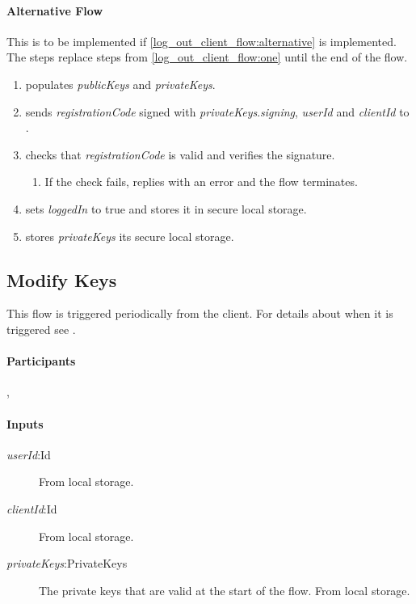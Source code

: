 \documentclass[a4paper,10pt,draft]{article}
\newcommand{\registrationCode}{\emph{registrationCode}}
\newcommand{\privateKeys}{\emph{privateKeys}}
\newcommand{\publicKeys}{\emph{publicKeys}}
\newcommand{\signingKey}{\privateKeys{}.\emph{signing}}
\newcommand{\userId}{\emph{userId}}
\newcommand{\clientId}{\emph{clientId}}
\newcommand{\loggedIn}{\emph{loggedIn}}
\begin{document}
\paragraph{Alternative Flow}
\label{log_in_client_flow:alternative}

This is to be implemented if \ref{log_out_client_flow:alternative} is implemented. The steps replace steps from \ref{log_out_client_flow:one} until the end of the flow.

\begin{enumerate}
 \item \Client{} populates \publicKeys{} and \privateKeys{}.
 \item \Client{} sends \registrationCode{} signed with \signingKey{}, \userId{} and \clientId{} to \Server{}.
 \item \Server{} checks that \registrationCode{} is valid and verifies the signature.
 \begin{enumerate}
  \item If the check fails, \Server{} replies with an error and the flow terminates.
 \end{enumerate}
 \item \Client{} sets \loggedIn{} to true and stores it in secure local storage.
 \item \Client{} stores \privateKeys{} its secure local storage.
\end{enumerate}

\subsection{Modify Keys}
\label{modify_keys_flow}
This flow is triggered periodically from the client. For details about when it is triggered see \cite{crypto_spec}.

\paragraph{Participants} \Client{}, \Server{}

\paragraph{Inputs}
\SpecialItem
\begin{description}
 \item[\userId{}:Id] From \Client{} local storage.
 \item[\clientId{}:Id] From \Client{} local storage.
 \item[\privateKeys{}:PrivateKeys] The private keys that are valid at the start of the flow. From \Client{} local storage.
\end{description}
\end{document}
